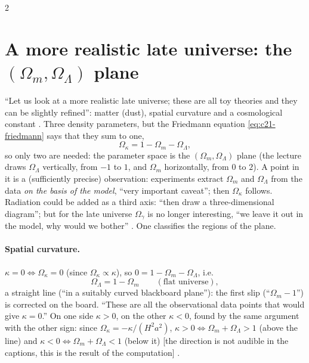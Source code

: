 \begin{paracol}{2}
\section{A more realistic late universe: the $(\Omega_m,\Omega_\Lambda)$ plane}\label{sec:c21-plane}

``Let us look at a more realistic late universe; these are all toy theories and they can be slightly refined'': matter (dust), spatial curvature and a cosmological constant . Three density parameters, but the Friedmann equation \eqref{eq:c21-friedmann} says that they sum to one,
\[
  \Omega_\kappa=1-\Omega_m-\Omega_\Lambda,
\]
so only two are needed: the parameter space is the $(\Omega_m,\Omega_\Lambda)$ plane (the lecture draws $\Omega_\Lambda$ vertically, from $-1$ to $1$, and $\Omega_m$ horizontally, from $0$ to $2$). A point in it is a (sufficiently precise) observation: experiments extract $\Omega_m$ and $\Omega_\Lambda$ from the data \emph{on the basis of the model}, ``very important caveat''; then $\Omega_\kappa$ follows. Radiation could be added as a third axis: ``then draw a three-dimensional diagram''; but for the late universe $\Omega_\gamma$ is no longer interesting, ``we leave it out in the model, why would we bother'' .
One classifies the regions of the plane.

\paragraph{Spatial curvature.} $\kappa=0\iff\Omega_\kappa=0$ (since $\Omega_\kappa\propto\kappa$), so $0=1-\Omega_m-\Omega_\Lambda$, i.e.
\[
  \Omega_\Lambda=1-\Omega_m\qquad(\text{flat universe}),
\]
a straight line (``in a suitably curved blackboard plane''): the first slip (``$\Omega_m-1$'') is corrected on the board. ``These are all the observational data points that would give $\kappa=0$.'' On one side $\kappa>0$, on the other $\kappa<0$, found by the same argument with the other sign: since $\Omega_\kappa=-\kappa/(H^2a^2)$, $\kappa>0\iff\Omega_m+\Omega_\Lambda>1$ (above the line) and $\kappa<0\iff\Omega_m+\Omega_\Lambda<1$ (below it) [the direction is not audible in the captions, this is the result of the computation] .


\end{paracol}
